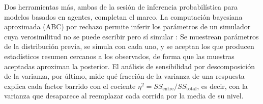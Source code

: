 Dos herramientas más, ambas de la sesión de inferencia probabilística para modelos basados en agentes, completan el marco. La computación bayesiana aproximada (ABC) por rechazo permite inferir los parámetros de un simulador cuya verosimilitud no se puede escribir pero sí simular \parencite{beaumont2002approximate}: Se muestrean parámetros de la distribución previa, se simula con cada uno, y se aceptan los que producen estadísticos resumen cercanos a los observados, de forma que las muestras aceptadas aproximan la posterior. El análisis de sensibilidad por descomposición de la varianza, por último, mide qué fracción de la varianza de una respuesta explica cada factor barrido con el cociente $\eta^2 = SS_{\text{entre}}/SS_{\text{total}}$, es decir, con la varianza que desaparece al reemplazar cada corrida por la media de su nivel.

